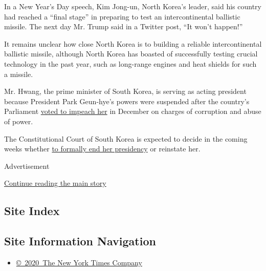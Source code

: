 In a New Year's Day speech, Kim Jong-un, North Korea's leader, said his
country had reached a ``final stage'' in preparing to test an
intercontinental ballistic missile. The next day Mr. Trump said in a
Twitter post, ``It won't happen!''

It remains unclear how close North Korea is to building a reliable
intercontinental ballistic missile, although North Korea has boasted of
successfully testing crucial technology in the past year, such as
long-range engines and heat shields for such a missile.

Mr. Hwang, the prime minister of South Korea, is serving as acting
president because President Park Geun-hye's powers were suspended after
the country's Parliament
\href{https://www.nytimes.com/2016/12/09/world/asia/south-korea-president-park-geun-hye-impeached.html}{voted
to impeach her} in December on charges of corruption and abuse of power.

The Constitutional Court of South Korea is expected to decide in the
coming weeks whether
\href{https://www.nytimes.com/2016/12/22/world/asia/south-korea-president-park-impeachment.html}{to
formally end her presidency} or reinstate her.

Advertisement

\protect\hyperlink{after-bottom}{Continue reading the main story}

\hypertarget{site-index}{%
\subsection{Site Index}\label{site-index}}

\hypertarget{site-information-navigation}{%
\subsection{Site Information
Navigation}\label{site-information-navigation}}

\begin{itemize}
\tightlist
\item
  \href{https://help.nytimes.com/hc/en-us/articles/115014792127-Copyright-notice}{©~2020~The
  New York Times Company}
\end{itemize}

